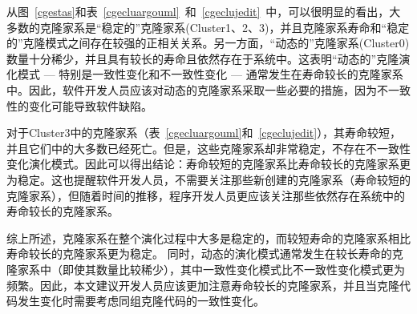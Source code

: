 从图~\ref{cgestas}和表~\ref{cgecluargouml}~和~\ref{cgeclujedit}~中，可以很明显的看出，大多数的克隆家系是“稳定的”克隆家系(Cluster1、2、3)，并且克隆家系寿命和“稳定的”克隆模式之间存在较强的正相关关系。另一方面，“动态的”克隆家系(Cluster0)数量十分稀少，并且具有较长的寿命且依然存在于系统中。这表明“动态的”克隆演化模式 --- 特别是一致性变化和不一致性变化 --- 通常发生在寿命较长的克隆家系中。因此，软件开发人员应该对动态的克隆家系采取一些必要的措施，因为不一致性的变化可能导致软件缺陷。

对于Cluster3中的克隆家系（表~\ref{cgecluargouml}和~\ref{cgeclujedit}），其寿命较短，并且它们中的大多数已经死亡。但是，这些克隆家系却非常稳定，不存在不一致性变化演化模式。因此可以得出结论：寿命较短的克隆家系比寿命较长的克隆家系更为稳定。这也提醒软件开发人员，不需要关注那些新创建的克隆家系（寿命较短的克隆家系），但随着时间的推移，程序开发人员更应该关注那些依然存在系统中的寿命较长的克隆家系。

综上所述，克隆家系在整个演化过程中大多是稳定的，而较短寿命的克隆家系相比寿命较长的克隆家系更为稳定。 同时，动态的演化模式通常发生在较长寿命的克隆家系中（即使其数量比较稀少），其中一致性变化模式比不一致性变化模式更为频繁。因此，本文建议开发人员应该更加注意寿命较长的克隆家系，并且当克隆代码发生变化时需要考虑同组克隆代码的一致性变化。

